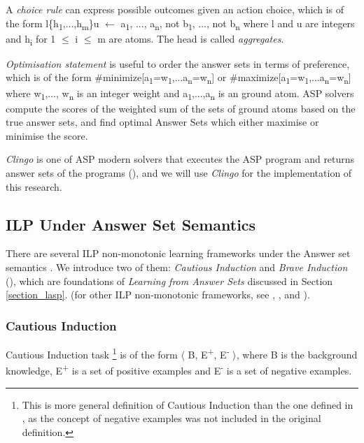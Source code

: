 \documentclass[12pt,twoside]{report}
\begin{document}
A \textit{choice rule} can express possible outcomes given an action choice, which is of the form
l\{h\textsubscript{1},...,h\textsubscript{m}\}u $\leftarrow$ a\textsubscript{1}, ..., a\textsubscript{n}, not b\textsubscript{1}, ..., not b\textsubscript{n} where  l and u are integers and h\textsubscript{i} for 1 $\leq$ i $\leq$ m are atoms. The head is called \textit{aggregates}.

\textit{Optimisation statement} is useful to order the answer sets in terms of preference, which is of the form
\#minimize[a\textsubscript{1}=w\textsubscript{1},...a\textsubscript{n}=w\textsubscript{n}] or \#maximize[a\textsubscript{1}=w\textsubscript{1},...a\textsubscript{n}=w\textsubscript{n}] where w\textsubscript{1},..., w\textsubscript{n} is an integer weight and a\textsubscript{1},...,a\textsubscript{n} is an ground atom.  ASP solvers compute the scores of the weighted sum of the sets of ground atoms based on the true answer sets, and find optimal Answer Sets which either maximise or minimise the score.

\textit{Clingo} is one of ASP modern solvers that executes the ASP program and returns answer sets of the programs (\cite{Gebser2011}), and we will use \textit{Clingo} for the implementation of this research.


\subsection{ILP Under Answer Set Semantics}

There are several ILP non-monotonic learning frameworks under the Answer set semantics . We introduce two of them: \textit{Cautious Induction} and \textit{Brave Induction} (\cite{Sakama2009}), which are foundations of \textit{Learning from Answer Sets} discussed in Section \ref{section_lasp}.  (for other ILP non-monotonic frameworks, see \cite{Otero2001}, \cite{Inoue2014}, \cite{Corapi2012} and \cite{DeRaedt1997}).
\subsubsection{Cautious Induction }
Cautious Induction task \footnote{This is more general definition of Cautious Induction than the one defined in \cite{Sakama2009}, as the concept of negative examples was not included in the original definition.} is of the form $\langle$ B, E\textsuperscript{+}, E\textsuperscript{-} $\rangle$, where B is the background knowledge, E\textsuperscript{+} is a set of positive examples and E\textsuperscript{-} is a set of negative examples.
\end{document}
